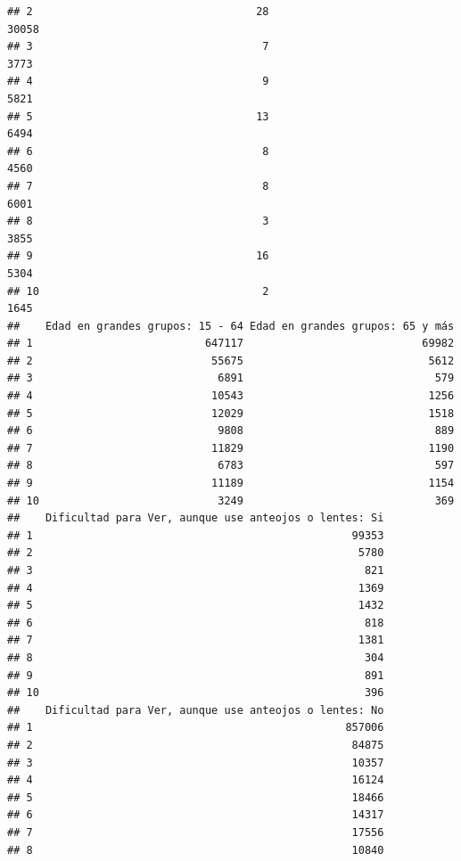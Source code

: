 \documentclass[11pt,]{article}
\begin{document}
\begin{verbatim}
## 2                                   28                          30058
## 3                                    7                           3773
## 4                                    9                           5821
## 5                                   13                           6494
## 6                                    8                           4560
## 7                                    8                           6001
## 8                                    3                           3855
## 9                                   16                           5304
## 10                                   2                           1645
##    Edad en grandes grupos: 15 - 64 Edad en grandes grupos: 65 y más
## 1                           647117                            69982
## 2                            55675                             5612
## 3                             6891                              579
## 4                            10543                             1256
## 5                            12029                             1518
## 6                             9808                              889
## 7                            11829                             1190
## 8                             6783                              597
## 9                            11189                             1154
## 10                            3249                              369
##    Dificultad para Ver, aunque use anteojos o lentes: Si
## 1                                                  99353
## 2                                                   5780
## 3                                                    821
## 4                                                   1369
## 5                                                   1432
## 6                                                    818
## 7                                                   1381
## 8                                                    304
## 9                                                    891
## 10                                                   396
##    Dificultad para Ver, aunque use anteojos o lentes: No
## 1                                                 857006
## 2                                                  84875
## 3                                                  10357
## 4                                                  16124
## 5                                                  18466
## 6                                                  14317
## 7                                                  17556
## 8                                                  10840

\end{verbatim}
\end{document}
